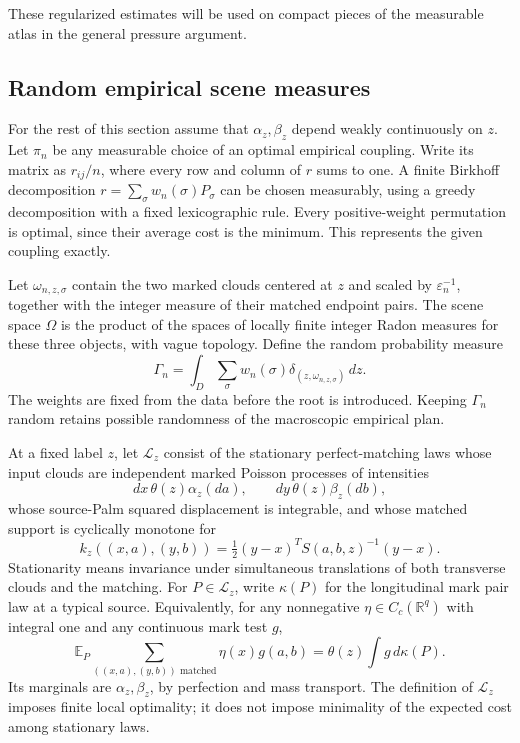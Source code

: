 \documentclass[11pt,reqno]{amsart}
\theoremstyle{definition}
\theoremstyle{remark}
\numberwithin{equation}{section}
\newcommand{\R}{\mathbb R}
\newcommand{\E}{\mathbb E}
\begin{document}
These regularized estimates will be used on compact pieces of the
measurable atlas in the general pressure argument.

\subsection{Random empirical scene measures}

For the rest of this section assume that \(\alpha_z,\beta_z\)
depend weakly continuously on \(z\). Let \(\pi_n\) be any measurable
choice of an optimal empirical coupling. Write its matrix as
\(r_{ij}/n\), where every row and column of \(r\) sums to one.
A finite Birkhoff decomposition
\(r=\sum_\sigma w_n(\sigma)P_\sigma\) can be chosen measurably,
using a greedy decomposition with a fixed lexicographic rule.
Every positive-weight permutation is optimal, since their average
cost is the minimum. This represents the given coupling exactly.

Let \(\omega_{n,z,\sigma}\) contain the two marked clouds centered
at \(z\) and scaled by \(\varepsilon_n^{-1}\), together with the
integer measure of their matched endpoint pairs. The scene space
\(\Omega\) is the product of the spaces of locally finite integer
Radon measures for these three objects, with vague topology.
Define the random probability measure
\begin{equation}
\Gamma_n=\int_D\sum_\sigma w_n(\sigma)
 \delta_{(z,\omega_{n,z,\sigma})}\,dz.
\label{eq:highd-scene}
\end{equation}
The weights are fixed from the data before the root is introduced.
Keeping \(\Gamma_n\) random retains possible randomness of the
macroscopic empirical plan.

At a fixed label \(z\), let \(\mathcal L_z\) consist of the
stationary perfect-matching laws whose input clouds are independent
marked Poisson processes of intensities
\[
dx\,\theta(z)\alpha_z(da),\qquad dy\,\theta(z)\beta_z(db),
\]
whose source-Palm squared displacement is integrable, and whose
matched support is cyclically monotone for
\begin{equation}
k_z((x,a),(y,b))=
 \tfrac12(y-x)^T S(a,b,z)^{-1}(y-x).
\label{eq:highd-local-cost}
\end{equation}
Stationarity means invariance under simultaneous translations of
both transverse clouds and the matching. For \(P\in\mathcal L_z\),
write \(\kappa(P)\) for the longitudinal mark pair law at a typical
source. Equivalently, for any nonnegative \(\eta\in C_c(\R^q)\)
with integral one and any continuous mark test \(g\),
\[
\E_P\sum_{((x,a),(y,b))\text{ matched}}\eta(x)g(a,b)
 =\theta(z)\int g\,d\kappa(P).
\]
Its marginals are \(\alpha_z,\beta_z\), by perfection and mass
transport. The definition of \(\mathcal L_z\) imposes finite local
optimality; it does not impose minimality of the expected cost
among stationary laws.
\end{document}
